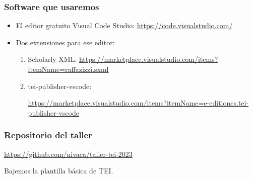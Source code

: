 \documentclass[%
  handout, %
  ]{beamer}
\begin{document}
\begin{frame}
  \frametitle{Software que usaremos}
  \begin{itemize}
    \item El editor gratuito Visual Code Studio: \url{https://code.visualstudio.com/}
    \item Dos extensiones para ese editor:
      \begin{enumerate}
        \item Scholarly XML: \url{https://marketplace.visualstudio.com/items?itemName=raffazizzi.sxml}
        \item tei-publisher-vscode:

          \url{https://marketplace.visualstudio.com/items?itemName=e-editiones.tei-publisher-vscode}
      \end{enumerate}
  \end{itemize}
\end{frame}


\begin{frame}
  \frametitle{Repositorio del taller}

  \centering

  \url{https://github.com/nivaca/taller-tei-2023}

  \bigskip

  Bajemos la plantilla básica de TEI.

  
\end{frame}
\end{document}
